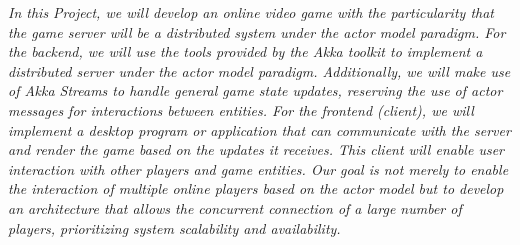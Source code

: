 \textit{
    In this Project, we will develop an online video game with the particularity that the game server will be a distributed system under the actor model paradigm.
For the backend, we will use the tools provided by the Akka toolkit to implement a distributed server under the actor model paradigm. Additionally, we will make use of Akka Streams to handle general game state updates, reserving the use of actor messages for interactions between entities.
For the frontend (client), we will implement a desktop program or application that can communicate with the server and render the game based on the updates it receives. This client will enable user interaction with other players and game entities.
Our goal is not merely to enable the interaction of multiple online players based on the actor model but to develop an architecture that allows the concurrent connection of a large number of players, prioritizing system scalability and availability.
}